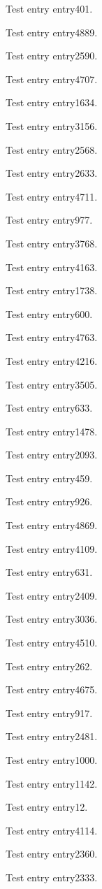Test entry \gls{entry401}.

Test entry \gls{entry4889}.

Test entry \gls{entry2590}.

Test entry \gls{entry4707}.

Test entry \gls{entry1634}.

Test entry \gls{entry3156}.

Test entry \gls{entry2568}.

Test entry \gls{entry2633}.

Test entry \gls{entry4711}.

Test entry \gls{entry977}.

Test entry \gls{entry3768}.

Test entry \gls{entry4163}.

Test entry \gls{entry1738}.

Test entry \gls{entry600}.

Test entry \gls{entry4763}.

Test entry \gls{entry4216}.

Test entry \gls{entry3505}.

Test entry \gls{entry633}.

Test entry \gls{entry1478}.

Test entry \gls{entry2093}.

Test entry \gls{entry459}.

Test entry \gls{entry926}.

Test entry \gls{entry4869}.

Test entry \gls{entry4109}.

Test entry \gls{entry631}.

Test entry \gls{entry2409}.

Test entry \gls{entry3036}.

Test entry \gls{entry4510}.

Test entry \gls{entry262}.

Test entry \gls{entry4675}.

Test entry \gls{entry917}.

Test entry \gls{entry2481}.

Test entry \gls{entry1000}.

Test entry \gls{entry1142}.

Test entry \gls{entry12}.

Test entry \gls{entry4114}.

Test entry \gls{entry2360}.

Test entry \gls{entry2333}.


